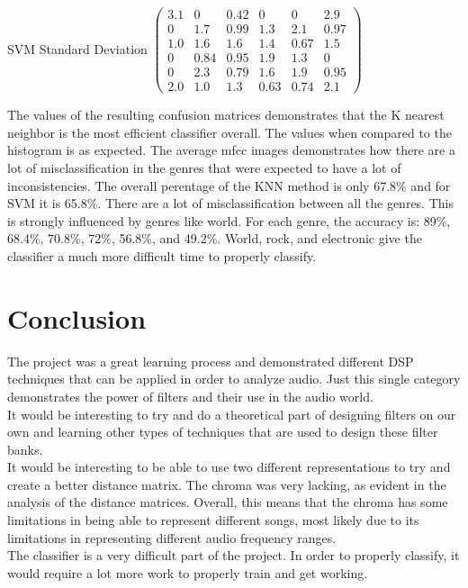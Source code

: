 \documentclass[11pt, a4paper]{article}
\begin{document}
SVM Standard Deviation \hfill $\left(\begin{array}{cccccc} 3.1 & 0 & 0.42 & 0 & 0 & 2.9\\ 0 & 1.7 & 0.99 & 1.3 & 2.1 & 0.97\\ 1.0 & 1.6 & 1.6 & 1.4 & 0.67 & 1.5\\ 0 & 0.84 & 0.95 & 1.9 & 1.3 & 0\\ 0 & 2.3 & 0.79 & 1.6 & 1.9 & 0.95\\ 2.0 & 1.0 & 1.3 & 0.63 & 0.74 & 2.1 \end{array}\right)$

	
The values of the resulting confusion matrices demonstrates that the K nearest neighbor is the most efficient classifier overall. The values when compared to the histogram is as expected. The average mfcc images demonstrates how there are a lot of misclassification in the genres that were expected to have a lot of inconsistencies. The overall perentage of the KNN method is only 67.8\% and for SVM it is 65.8\%. There are a lot of misclassification between all the genres. This is strongly influenced by genres like world. For each genre, the accuracy is: 89\%, 68.4\%, 70.8\%, 72\%, 56.8\%, and 49.2\%. World, rock, and electronic give the classifier a much more difficult time to properly classify. 

\section{Conclusion}

The project was a great learning process and demonstrated different DSP techniques that can be applied in order to analyze audio. Just this single category demonstrates the power of filters and their use in the audio world. \\

It would be interesting to try and do a theoretical part of designing filters on our own and learning other types of techniques that are used to design these filter banks. \\

It would be interesting to be able to use two different representations to try and create a better distance matrix. The chroma was very lacking, as evident in the analysis of the distance matrices. Overall, this means that the chroma has some limitations in being able to represent different songs, most likely due to its limitations in representing different audio frequency ranges. \\

The classifier is a very difficult part of the project. In order to properly classify, it would require a lot more work to properly train and get working. 
\end{document}
